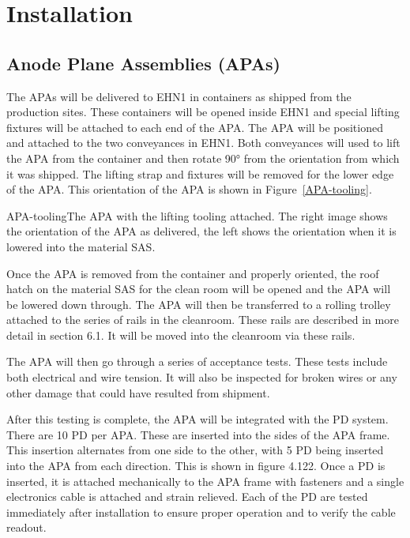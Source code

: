 
\section{Installation}


\subsection{Anode Plane Assemblies (APAs)}

The APAs will be delivered to EHN1 in containers as shipped from the production sites.  These containers will be opened inside EHN1 and special lifting fixtures will be attached to each end of the APA.  The APA will be positioned and attached to the two conveyances in EHN1.  Both conveyances will used to lift the APA from the container and then rotate 90° from the orientation from which it was shipped.  The lifting strap and fixtures will be removed for the lower edge of the APA.  This orientation of the APA is shown in Figure~\ref{APA-tooling}.

\begin{cdrfigure}{APA-tooling}{The APA with the lifting tooling attached.  The right image shows the orientation of the APA as delivered, the left shows the orientation when it is lowered into the material SAS. }
\end{cdrfigure}

Once the APA is removed from the container and properly oriented, the roof hatch on the material SAS for the clean room will be opened and the APA will be lowered down through.  The APA will then be transferred to a rolling trolley attached to the series of rails in the cleanroom.  These rails are described in more detail in section 6.1.  It will be moved into the cleanroom via these rails.  

The APA will then go through a series of acceptance tests.  These tests include both electrical and wire tension.  It will also be inspected for broken wires or any other damage that could have resulted from shipment.  

After this testing is complete, the APA will be integrated with the PD system.  There are 10 PD per APA.  These are inserted into the sides of the APA frame.  This insertion alternates from one side to the other, with 5 PD being inserted into the APA from each direction.  This is shown in figure 4.122.  Once a PD is inserted, it is attached mechanically to the APA frame with fasteners and a single electronics cable is attached and strain relieved.  Each of the PD are tested immediately after installation to ensure proper operation and to verify the cable readout.  

